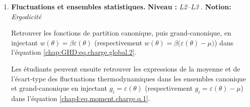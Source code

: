 {\begin{enumerate}[label =\textbf{\arabic*.}, ref=\arabic*]

    \item {\bf \textsf{Fluctuations et ensembles statistiques.}} \textbf{Niveau :} {\em L2--L3} . \textbf{Notion:} {\em Ergodicité }

          Retrouver les fonctions de partition canonique, puis grand-canonique, en
          injectant \( w(\theta)=\beta \varepsilon(\theta) \) (respectivement \(
          w(\theta)=\beta\big(\varepsilon(\theta)-\mu\big) \)) dans l’équation
          \eqref{chap:GHD:eq.charge.global.2}.

          Les étudiants peuvent ensuite retrouver les expressions de la moyenne et de
          l’écart-type des fluctuations thermodynamiques dans les ensembles canonique et
          grand-canonique en injectant \( g_i=\varepsilon(\theta) \) (respectivement \(
          g_i=\varepsilon(\theta)-\mu \)) dans l’équation
          \eqref{chap4:eq.moment.charge.q.1}.





\end{enumerate}





}

